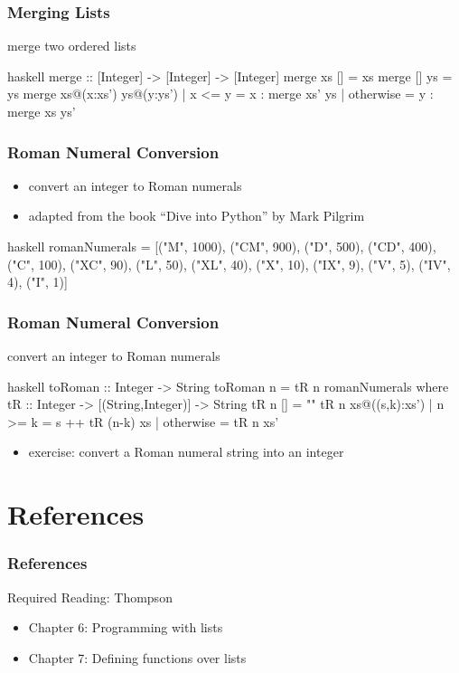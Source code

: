 \documentclass[dvipsnames]{beamer}
\theoremstyle{plain}
\begin{document}
\begin{frame}[fragile]
  \frametitle{Merging Lists}

  \begin{exampleblock}{merge two ordered lists}
    \begin{pygments}{haskell}
merge :: [Integer] -> [Integer] -> [Integer]
merge xs     []             = xs
merge []     ys             = ys
merge xs@(x:xs') ys@(y:ys')
  | x <= y    = x : merge xs' ys
  | otherwise = y : merge xs  ys'
    \end{pygments}
  \end{exampleblock}
\end{frame}

\begin{frame}[fragile]
  \frametitle{Roman Numeral Conversion}

  \begin{itemize}
    \item convert an integer to Roman numerals
    \item adapted from the book ``Dive into Python'' by Mark Pilgrim
  \end{itemize}

  \begin{exampleblock}{}
    \begin{pygments}{haskell}
romanNumerals =
  [("M", 1000), ("CM", 900), ("D", 500), ("CD", 400),
   ("C",  100), ("XC",  90), ("L",  50), ("XL",  40),
   ("X",   10), ("IX",   9), ("V",   5), ("IV",   4),
   ("I",    1)]
    \end{pygments}
  \end{exampleblock}
\end{frame}

\begin{frame}[fragile]
  \frametitle{Roman Numeral Conversion}

  \begin{exampleblock}{convert an integer to Roman numerals}
    \begin{pygments}{haskell}
toRoman :: Integer -> String
toRoman n = tR n romanNumerals
  where
    tR :: Integer -> [(String,Integer)] -> String
    tR n []             = ""
    tR n xs@((s,k):xs')
      | n >= k    = s ++ tR (n-k) xs
      | otherwise = tR n xs'
    \end{pygments}
  \end{exampleblock}

  \pause
  \begin{itemize}
    \item exercise: convert a Roman numeral string into an integer
  \end{itemize}
\end{frame}

\section*{References}

\begin{frame}
  \frametitle{References}

  \begin{block}{Required Reading: Thompson}
    \begin{itemize}
      \item Chapter 6: \alert{Programming with lists}
      \item Chapter 7: \alert{Defining functions over lists}
    \end{itemize}
  \end{block}
\end{frame}
\end{document}
